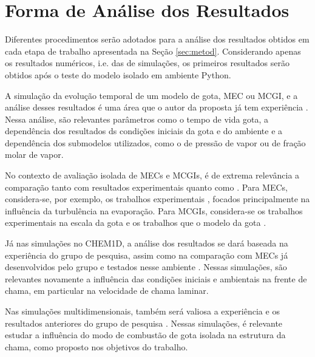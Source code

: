 
\section{Forma de Análise dos Resultados} \label{sec:resultados}

Diferentes procedimentos serão adotados para a análise dos resultados obtidos em cada etapa de trabalho apresentada na Seção \ref{sec:metod}.
Considerando apenas os resultados numéricos, i.e. das de simulações, os primeiros resultados serão obtidos após o teste do modelo isolado em ambiente Python. 

A simulação da evolução temporal de um modelo de gota, MEC ou MCGI, e a análise desses resultados é uma área que o autor da proposta já tem experiência \cite{HenningsJ2024MT}. 
Nessa análise, são relevantes parâmetros como o tempo de vida gota, a dependência dos resultados ds condições iniciais da gota e do ambiente e a dependência dos submodelos utilizados, como o de pressão de vapor ou de fração molar de vapor.

No contexto de avaliação isolada de MECs e MCGIs, é de extrema relevância a comparação tanto com resultados experimentais quanto como .
Para MECs, considera-se, por exemplo, os trabalhos experimentais \cite{BiroukM2006,PatelU2019,KayaEyiceD2024,ArabkhalajA2024,MaquaC2008}, focados principalmente na influência da turbulência na evaporação.
Para MCGIs, considera-se os trabalhos experimentais na escala da gota \cite{ChoS1990SCI,CandelS1999,ChenG1996CF,Xu2002,BiroukM2000,CuociA2005,SetyawanH2015} e os trabalhos que  o modelo da gota \cite{Stauch2006,CuociA2005,ChoS1990SCI,KazakovA2003CF,MarcheseA1996CF,WangW2024}.

Já nas simulações no CHEM1D, a análise dos resultados se dará baseada na experiência do grupo de pesquisa, assim como na comparação com MECs já desenvolvidos pelo grupo e testados nesse ambiente \cite{SacomanoF2018CTM,SacomanoF2019IJHMT,SacomanoF2021Fluids,SacomanoF2024CF,SacomanoF2025CF}.
Nessas simulações, são relevantes novamente a influência das condições iniciais e ambientais na frente de chama, em particular na velocidade de chama laminar.

Nas simulações multidimensionais, também será valiosa a experiência e os resultados anteriores do grupo de pesquisa \cite{SacomanoF2017CF,SacomanoF2020CF}.
Nessas simulações, é relevante estudar a influência do modo de combustão de gota isolada na estrutura da chama, como proposto nos objetivos do trabalho.

